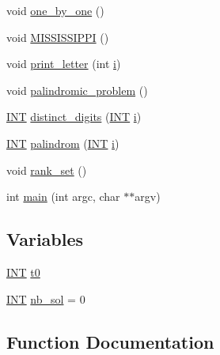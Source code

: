\begin{DoxyCompactItemize}
void \mbox{\hyperlink{test_8_c_a98a5fef7ee4b4629f64f6f39cc3b14f3}{one\+\_\+by\+\_\+one}} ()
\item 
void \mbox{\hyperlink{test_8_c_a6b9b430aa5f11f44b0ef89f5d2ba22a2}{M\+I\+S\+S\+I\+S\+S\+I\+P\+PI}} ()
\item 
void \mbox{\hyperlink{test_8_c_a47b299883feccc3b8a73afea584cc80b}{print\+\_\+letter}} (int \mbox{\hyperlink{alphabet2_8_c_acb559820d9ca11295b4500f179ef6392}{i}})
\item 
void \mbox{\hyperlink{test_8_c_a98b64257f380a3e5ff7c62010d1462cd}{palindromic\+\_\+problem}} ()
\item 
\mbox{\hyperlink{galois_8h_a09fddde158a3a20bd2dcadb609de11dc}{I\+NT}} \mbox{\hyperlink{test_8_c_a6ce22fc76728a3d654b9d24f6883d20a}{distinct\+\_\+digits}} (\mbox{\hyperlink{galois_8h_a09fddde158a3a20bd2dcadb609de11dc}{I\+NT}} \mbox{\hyperlink{alphabet2_8_c_acb559820d9ca11295b4500f179ef6392}{i}})
\item 
\mbox{\hyperlink{galois_8h_a09fddde158a3a20bd2dcadb609de11dc}{I\+NT}} \mbox{\hyperlink{test_8_c_a7baf85389f06cdc8fd52abec6149b37a}{palindrom}} (\mbox{\hyperlink{galois_8h_a09fddde158a3a20bd2dcadb609de11dc}{I\+NT}} \mbox{\hyperlink{alphabet2_8_c_acb559820d9ca11295b4500f179ef6392}{i}})
\item 
void \mbox{\hyperlink{test_8_c_a350aa48203a918c614ede2fc64837086}{rank\+\_\+set}} ()
\item 
int \mbox{\hyperlink{test_8_c_a3c04138a5bfe5d72780bb7e82a18e627}{main}} (int argc, char $\ast$$\ast$argv)
\end{DoxyCompactItemize}
\subsection*{Variables}
\begin{DoxyCompactItemize}
\item 
\mbox{\hyperlink{galois_8h_a09fddde158a3a20bd2dcadb609de11dc}{I\+NT}} \mbox{\hyperlink{test_8_c_a4268f4fe222ffb119218a0199f5e1904}{t0}}
\item 
\mbox{\hyperlink{galois_8h_a09fddde158a3a20bd2dcadb609de11dc}{I\+NT}} \mbox{\hyperlink{test_8_c_a0029b734487624c93c3a72d74a8f2bf9}{nb\+\_\+sol}} = 0
\end{DoxyCompactItemize}


\subsection{Function Documentation}
\mbox{\label{test_8_c_a6305520cf78b894bf9380f5102f323a0}} 

